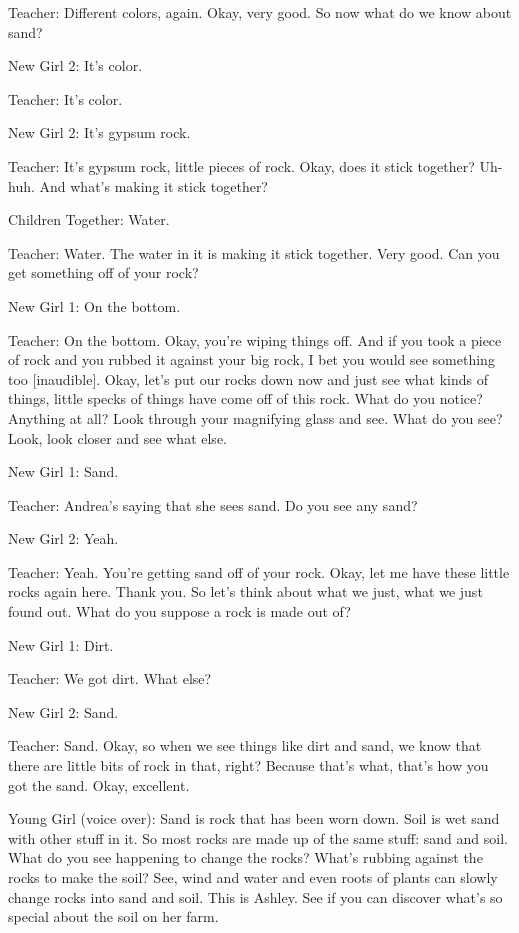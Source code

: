 Teacher: Different colors, again. Okay, very good. So now what do we know about sand?

New Girl 2: It's color.

Teacher: It's color.

New Girl 2: It's gypsum rock.

Teacher: It's gypsum rock, little pieces of rock. Okay, does it stick together? Uh-huh. And what's making it stick together?

Children Together: Water.

Teacher: Water. The water in it is making it stick together. Very good. Can you get something off of your rock?

New Girl 1: On the bottom.

Teacher: On the bottom. Okay, you're wiping things off. And if you took a piece of rock and you rubbed it against your big rock, I bet you would see something too [inaudible]. Okay, let's put our rocks down now and just see what kinds of things, little specks of things have come off of this rock. What do you notice? Anything at all? Look through your magnifying glass and see. What do you see? Look, look closer and see what else.

New Girl 1: Sand.

Teacher: Andrea's saying that she sees sand. Do you see any sand?

New Girl 2: Yeah.

Teacher: Yeah. You're getting sand off of your rock. Okay, let me have these little rocks again here. Thank you. So let's think about what we just, what we just found out. What do you suppose a rock is made out of?

New Girl 1: Dirt.

Teacher: We got dirt. What else?

New Girl 2: Sand.

Teacher: Sand. Okay, so when we see things like dirt and sand, we know that there are little bits of rock in that, right? Because that's what, that's how you got the sand. Okay, excellent.

Young Girl (voice over): Sand is rock that has been worn down. Soil is wet sand with other stuff in it. So most rocks are made up of the same stuff: sand and soil. What do you see happening to change the rocks? What's rubbing against the rocks to make the soil? See, wind and water and even roots of plants can slowly change rocks into sand and soil. This is Ashley. See if you can discover what's so special about the soil on her farm.

